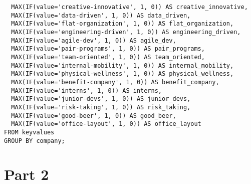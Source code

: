 \documentclass[12pt]{article}
\begin{document}
{\begin{verbatim}
  MAX(IF(value='creative-innovative', 1, 0)) AS creative_innovative,
  MAX(IF(value='data-driven', 1, 0)) AS data_driven,
  MAX(IF(value='flat-organization', 1, 0)) AS flat_organization,
  MAX(IF(value='engineering-driven', 1, 0)) AS engineering_driven,
  MAX(IF(value='agile-dev', 1, 0)) AS agile_dev,
  MAX(IF(value='pair-programs', 1, 0)) AS pair_programs,
  MAX(IF(value='team-oriented', 1, 0)) AS team_oriented,
  MAX(IF(value='internal-mobility', 1, 0)) AS internal_mobility,
  MAX(IF(value='physical-wellness', 1, 0)) AS physical_wellness,
  MAX(IF(value='benefit-company', 1, 0)) AS benefit_company,
  MAX(IF(value='interns', 1, 0)) AS interns,
  MAX(IF(value='junior-devs', 1, 0)) AS junior_devs,
  MAX(IF(value='risk-taking', 1, 0)) AS risk_taking,
  MAX(IF(value='good-beer', 1, 0)) AS good_beer,
  MAX(IF(value='office-layout', 1, 0)) AS office_layout
FROM keyvalues
GROUP BY company;
\end{verbatim}
}

\section*{Part 2}
\end{document}
